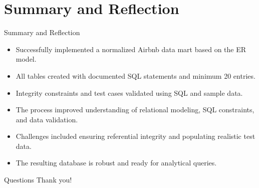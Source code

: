 \documentclass{beamer}
\begin{document}
\section{Summary and Reflection}
\begin{frame}{Summary and Reflection}
  \begin{itemize}
    \item Successfully implemented a normalized Airbnb data mart based on the ER model.
    \item All tables created with documented SQL statements and minimum 20 entries.
    \item Integrity constraints and test cases validated using SQL and sample data.
    \item The process improved understanding of relational modeling, SQL constraints, and data validation.
    \item Challenges included ensuring referential integrity and populating realistic test data.
    \item The resulting database is robust and ready for analytical queries.
  \end{itemize}
\end{frame}

\begin{frame}{Questions}
  \centering
  \Huge{Thank you!}
\end{frame}
\end{document}
